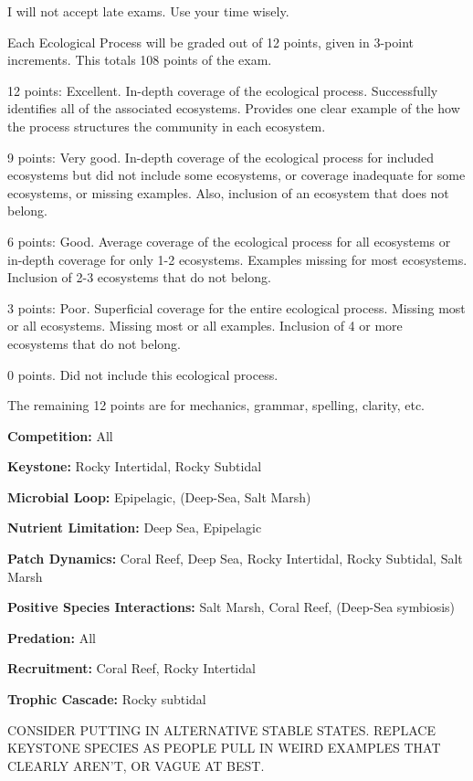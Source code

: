 \documentclass[11pt, addpoints]{exam}
\begin{document}
I will not accept late exams. Use your time wisely.


\newpage


Each Ecological Process will be graded out of 12 points, given in 3-point increments. This totals 108 points of the exam.

12 points: Excellent.  In-depth coverage of the ecological process. Successfully identifies all of the associated ecosystems. Provides one clear example of the how the process structures the community in each ecosystem.

9 points: Very good.  In-depth coverage of the ecological process for included ecosystems but did not include some ecosystems, or coverage inadequate for some ecosystems, or missing examples. Also, inclusion of an ecosystem that does not belong.

6 points: Good.  Average coverage of the ecological process for all ecosystems or in-depth coverage for only 1-2 ecosystems.  Examples missing for most ecosystems. Inclusion of 2-3 ecosystems that do not belong.

3 points: Poor.  Superficial coverage for the entire ecological process.  Missing most or all ecosystems.  Missing most or all examples. Inclusion of 4 or more ecosystems that do not belong.

0 points. Did not include this ecological process.


The remaining 12 points are for mechanics, grammar, spelling, clarity, etc.

\ifprintanswers

\textbf{Competition:} All

\textbf{Keystone:} Rocky Intertidal, Rocky Subtidal

\textbf{Microbial Loop:} Epipelagic, (Deep-Sea, Salt Marsh)

\textbf{Nutrient Limitation:} Deep Sea, Epipelagic

\textbf{Patch Dynamics:} Coral Reef, Deep Sea, Rocky Intertidal, Rocky Subtidal, Salt Marsh

\textbf{Positive Species Interactions:} Salt Marsh, Coral Reef, (Deep-Sea symbiosis)

\textbf{Predation:} All

\textbf{Recruitment:}  Coral Reef, Rocky Intertidal

\textbf{Trophic Cascade:} Rocky subtidal

CONSIDER PUTTING IN ALTERNATIVE STABLE STATES.  REPLACE KEYSTONE SPECIES AS PEOPLE PULL IN WEIRD EXAMPLES THAT CLEARLY AREN’T, OR VAGUE AT BEST.
\fi
\end{document}
